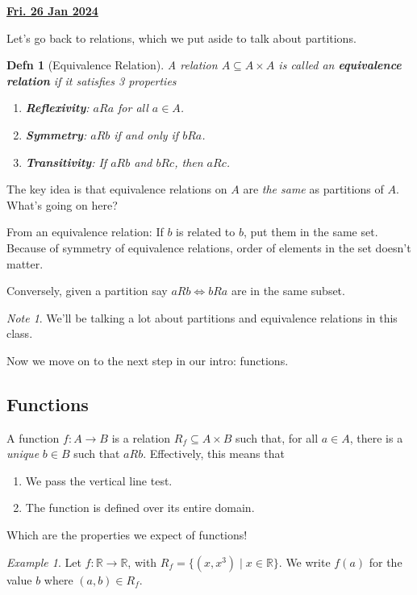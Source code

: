 \documentclass[12pt]{article}
\renewcommand{\date}[1]{\underline{\bf #1}}
\def\R{{\mathbb R}}
\newtheorem{definition}{Defn}
\theoremstyle{remark}
\theoremstyle{remark}
\theoremstyle{remark}
\newtheorem{example}{Example}
\theoremstyle{remark}
\theoremstyle{remark}
\newtheorem*{note}{Note}
\begin{document}
\date{Fri. 26 Jan 2024}

Let's go back to relations, which we put aside to talk about partitions.

\begin{definition}[Equivalence Relation]
	A relation $A \subseteq A \times A$ is called an {\bf equivalence relation}
	if it satisfies 3 properties

	\begin{enumerate}
		\item {\bf Reflexivity}: $aRa$ for all $a \in A$.
		\item {\bf Symmetry}: $aRb$ if and only if $bRa$.
		\item {\bf Transitivity}: If $aRb$ and $bRc$, then $aRc$.
	\end{enumerate}
\end{definition}

The key idea is that equivalence relations on $A$ are {\it the same} as
partitions of $A$. What's going on here?

From an equivalence relation: If $b$ is related to $b$, put them in the same
set. Because of symmetry of equivalence relations, order of elements in the
set doesn't matter.

Conversely, given a partition say $aRb \Leftrightarrow bRa$ are in the same
subset.

\begin{note}
	We'll be talking a lot about partitions and equivalence relations in this class.
\end{note}

Now we move on to the next step in our intro: functions.

\subsection{Functions}

A function $f: A \to B$ is a relation $R_f \subseteq A \times B$ such that,
for all $a \in A$, there is a {\it unique} $b \in B$ such that $aRb$.
Effectively, this means that

\begin{enumerate}
	\item We pass the vertical line test.
	\item The function is defined over its entire domain.
\end{enumerate}

Which are the properties we expect of functions!

\begin{example}
	Let $f: \R \to \R$, with $R_f = \{(x, x^3) \mid x \in \R \}$. We write $f(a)$
	for the value $b$ where $(a, b) \in R_f$.
\end{example}
\end{document}
